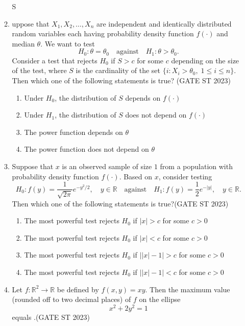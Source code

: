 \documentclass[journal]{IEEEtran}
\begin{document}
\begin{enumerate}[label=\textbf{Q.\arabic*.}, start=1, align=left, itemsep=2em]
\begin{enumerate}[label=\textbf{Q.\arabic*.}, start=11, align=left, itemsep=2em]
S\item uppose that $X_1, X_2, \dots, X_n$ are independent and identically distributed random 
variables each having probability density function $f(\cdot)$ and median $\theta$.  
We want to test
\[
H_0: \theta = \theta_0 \quad \text{against} \quad H_1: \theta > \theta_0.
\]
Consider a test that rejects $H_0$ if $S > c$ for some $c$ depending on the size of 
the test, where $S$ is the cardinality of the set $\{ i : X_i > \theta_0, \; 1 \le i \le n \}$.  
Then which one of the following statements is true? \hfill(GATE ST 2023) 

\begin{enumerate}[label=(\Alph*)]
    \item Under $H_0$, the distribution of $S$ depends on $f(\cdot)$
    \item Under $H_1$, the distribution of $S$ does not depend on $f(\cdot)$
    \item The power function depends on $\theta$
    \item The power function does not depend on $\theta$
\end{enumerate}

\item Suppose that $x$ is an observed sample of size $1$ from a population with 
probability density function $f(\cdot)$. Based on $x$, consider testing 
\[
H_0: f(y) = \frac{1}{\sqrt{2\pi}} e^{-y^2/2}, \quad y \in \mathbb{R} 
\quad \text{against} \quad 
H_1: f(y) = \frac12 e^{-|y|}, \quad y \in \mathbb{R}.
\]
Then which one of the following statements is true?\hfill(GATE ST 2023)  

\begin{enumerate}[label=(\Alph*)]
    \item The most powerful test rejects $H_0$ if $|x| > c$ for some $c>0$
    \item The most powerful test rejects $H_0$ if $|x| < c$ for some $c>0$
    \item The most powerful test rejects $H_0$ if $\big||x| - 1\big| > c$ for some $c>0$
    \item The most powerful test rejects $H_0$ if $\big||x| - 1\big| < c$ for some $c>0$
\end{enumerate}


\item Let $f: \mathbb{R}^2 \to \mathbb{R}$ be defined by $f(x, y) = xy$.  
Then the maximum value (rounded off to two decimal places) of $f$ on the ellipse  
\[
x^2 + 2y^2 = 1
\]
equals \underline{\hspace{2cm}}.\hfill(GATE ST 2023)



\end{enumerate}
\end{enumerate}
\end{document}
